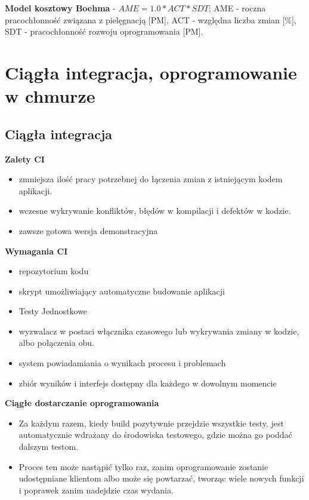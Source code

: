 \documentclass[a4paper]{article}
\begin{document}
    \textbf{Model kosztowy Boehma} - $AME = 1.0 * ACT * SDT$; AME - roczna pracochłonność związana
    z pielęgnacją [PM], ACT - względna liczba zmian [\%], SDT - pracochłonność rozwoju oprogramowania [PM].


    \section{Ciągła integracja, oprogramowanie w chmurze}

    \subsection{Ciągła integracja}

    \textbf{Zalety CI}
    \begin{itemize}
        \item zmniejsza ilość pracy potrzebnej do łączenia zmian
        z istniejącym kodem aplikacji.
        \item wczesne wykrywanie konfliktów, błędów w
        kompilacji i defektów w kodzie.
        \item zawsze gotowa wersja demonstracyjna
    \end{itemize}


    \textbf{Wymagania CI}
    \begin{itemize}
        \item repozytorium kodu
        \item skrypt umożliwiający automatyczne budowanie aplikacji
        \item Testy Jednostkowe
        \item wyzwalacz w postaci włącznika czasowego lub wykrywania zmiany w kodzie, albo połączenia obu.
        \item system powiadamiania o wynikach procesu i problemach
        \item zbiór wyników i interfejs dostępny dla każdego w dowolnym momencie
    \end{itemize}

    \textbf{Ciągłe dostarczanie oprogramowania}
    \begin{itemize}
        \item Za każdym razem, kiedy build pozytywnie przejdzie wszystkie testy, jest automatycznie wdrażany do
        środowiska testowego, gdzie można go poddać dalszym testom.
        \item Proces ten może nastąpić tylko raz, zanim oprogramowanie zostanie udostępniane klientom
        albo może się powtarzać, tworząc wiele nowych funkcji i poprawek zanim nadejdzie czas wydania.
    \end{itemize}
\end{document}
